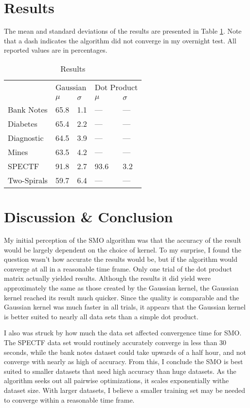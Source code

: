 \documentclass{article}
\begin{document}
\section{Results}
The mean and standard deviations of the results are presented in Table \ref{results-table}. Note that a dash indicates the algorithm did not converge in my overnight test. All reported values are in percentages. 

\begin{table}[tbp]
\centering
\begin{tabular}{lllll}
            & \multicolumn{2}{l}{Gaussian} & \multicolumn{2}{l}{Dot Product} \\ \cline{2-5} 
            & $\mu$        & $\sigma$      & $\mu$         & $\sigma$        \\ \hline
Bank Notes  & 65.8         & 1.1           & —             & —               \\
Diabetes    & 65.4         & 2.2           & —             & —               \\
Diagnostic  & 64.5         & 3.9           & —             & —               \\
Mines       & 63.5         & 4.2           & —             & —               \\
SPECTF      & 91.8         & 2.7           & 93.6          & 3.2             \\
Two-Spirals & 59.7         & 6.4           & —             & —              

\end{tabular}
\caption{Results}
\label{results-table}
\end{table}

\section{Discussion \& Conclusion}
My initial perception of the SMO algorithm was that the accuracy of the result would be largely dependent on the choice of kernel. To my surprise, I found the question wasn't how accurate the results would be, but if the algorithm would converge at all in a reasonable time frame. Only one trial of the dot product matrix actually yielded results. Although the results it did yield were approximately the same as those created by the Gaussian kernel, the  Gaussian kernel reached its result much quicker. Since the quality is comparable and the Gaussian kernel was much faster in all trials, it appears that the Gaussian kernel is better suited to nearly all data sets than a simple dot product.

I also was struck by how much the data set affected convergence time for SMO. The SPECTF data set would routinely accurately converge in less than 30 seconds, while the bank notes dataset could take upwards of a half hour, and not converge with nearly as high of accuracy. From this, I conclude the SMO is best suited to smaller datasets that need high accuracy than huge datasets. As the algorithm seeks out all pairwise optimizations, it scales exponentially withe dataset size. With larger datasets, I believe a smaller training set may be needed to converge within a reasonable time frame.
\end{document}
